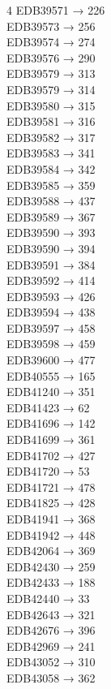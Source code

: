 \begin{multicols}{4}
EDB39571 → 226\\
EDB39573 → 256\\
EDB39574 → 274\\
EDB39576 → 290\\
EDB39579 → 313\\
EDB39579 → 314\\
EDB39580 → 315\\
EDB39581 → 316\\
EDB39582 → 317\\
EDB39583 → 341\\
EDB39584 → 342\\
EDB39585 → 359\\
EDB39588 → 437\\
EDB39589 → 367\\
EDB39590 → 393\\
EDB39590 → 394\\
EDB39591 → 384\\
EDB39592 → 414\\
EDB39593 → 426\\
EDB39594 → 438\\
EDB39597 → 458\\
EDB39598 → 459\\
EDB39600 → 477\\
EDB40555 → 165\\
EDB41240 → 351\\
EDB41423 → 62\\
EDB41696 → 142\\
EDB41699 → 361\\
EDB41702 → 427\\
EDB41720 → 53\\
EDB41721 → 478\\
EDB41825 → 428\\
EDB41941 → 368\\
EDB41942 → 448\\
EDB42064 → 369\\
EDB42430 → 259\\
EDB42433 → 188\\
EDB42440 → 33\\
EDB42643 → 321\\
EDB42676 → 396\\
EDB42969 → 241\\
EDB43052 → 310\\
EDB43058 → 362\end{multicols}
